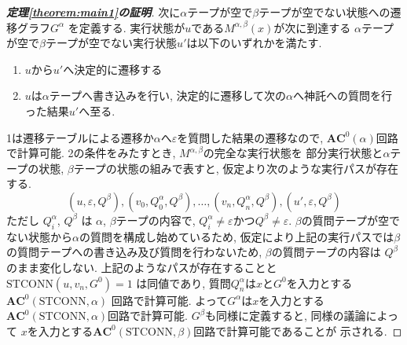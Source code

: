 \documentclass[11pt,a4paper]{jsarticle}
\theoremstyle{definition}
\theoremstyle{remark}
\newcommand{\classfont}{\mathbf}
\newcommand{\AC}{\classfont{AC}}
\newcommand{\probfont}{\text}
\newcommand{\STCONN}{\probfont{STCONN}}
\begin{document}
\begin{proof}[\bf 定理\ref{theorem:main1}の証明]
次に$\alpha$テープが空で$\beta$テープが空でない状態への遷移グラフ$G^\alpha$
を定義する.
実行状態が$u$である$M^{\alpha, \beta}(x)$が次に到達する
$\alpha$テープが空で$\beta$テープが空でない実行状態$u'$は以下のいずれかを満たす.
\begin{enumerate}
 \item $u$から$u'$へ決定的に遷移する
 \item $u$は$\alpha$テープへ書き込みを行い,
       決定的に遷移して次の$\alpha$へ神託への質問を行った結果$u'$へ至る.
\end{enumerate}
1は遷移テーブルによる遷移か$\alpha$へ$\varepsilon$を質問した結果の遷移なので,
$\AC^0(\alpha)$回路で計算可能.
2の条件をみたすとき, $M^{\alpha, \beta}$の完全な実行状態を
部分実行状態と$\alpha$テープの状態, $\beta$テープの状態の組みで表すと,
仮定より次のような実行パスが存在する.
\begin{equation*}
 (u, \varepsilon, Q^\beta), (v_0, Q^\alpha_0, Q^\beta), \dots, 
  (v_n, Q^\alpha_n, Q^\beta), (u', \varepsilon, Q^\beta)
\end{equation*}
ただし $Q^\alpha_i$, $Q^\beta$ は $\alpha$, $\beta$テープの内容で,
$Q^\alpha_i \not = \varepsilon$かつ$Q^\beta \not = \varepsilon$.
$\beta$の質問テープが空でない状態から$\alpha$の質問を構成し始めているため,
仮定により上記の実行パスでは$\beta$の質問テープへの書き込み及び質問を行わないため, $\beta$の質問テープの内容は $Q^\beta$ のまま変化しない.
上記のようなパスが存在することと$\STCONN(u, v_n, G^0) = 1$ は同値であり,
質問$Q^\alpha_n$は$x$と$G^0$を入力とする$\AC^0(\STCONN, \alpha)$
回路で計算可能.
よって$G^\alpha$は$x$を入力とする$\AC^0(\STCONN, \alpha)$回路で計算可能.
$G^\beta$も同様に定義すると, 同様の議論によって
$x$を入力とする$\AC^0(\STCONN, \beta)$回路で計算可能であることが
示される.


\end{proof}
\end{document}
